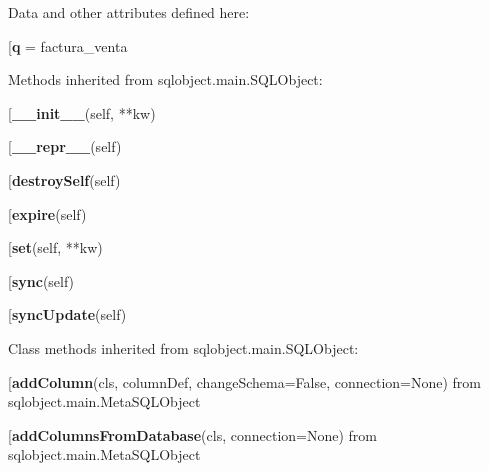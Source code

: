 Data and other attributes defined here:\\
\begin{description}\item[{\bf q} = factura\_venta\end{description}


Methods inherited from sqlobject.main.SQLObject:\\
\begin{description}\item[{\bf \_\_init\_\_}(self, **kw)\end{description}

\begin{description}\item[{\bf \_\_repr\_\_}(self)\end{description}

\begin{description}\item[{\bf destroySelf}(self)\end{description}

\begin{description}\item[{\bf expire}(self)\end{description}

\begin{description}\item[{\bf set}(self, **kw)\end{description}

\begin{description}\item[{\bf sync}(self)\end{description}

\begin{description}\item[{\bf syncUpdate}(self)\end{description}


Class methods inherited from sqlobject.main.SQLObject:\\
\begin{description}\item[{\bf addColumn}(cls, columnDef, changeSchema=False, connection=None) from sqlobject.main.MetaSQLObject\end{description}

\begin{description}\item[{\bf addColumnsFromDatabase}(cls, connection=None) from sqlobject.main.MetaSQLObject\end{description}

